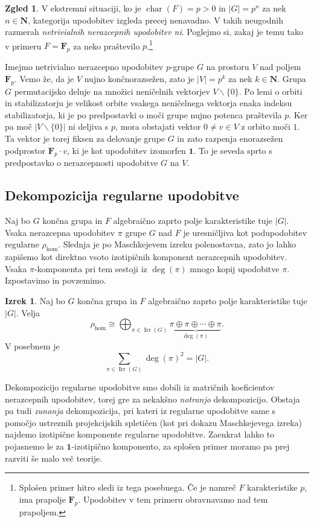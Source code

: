 \documentclass[11pt]{book}
\def\NN{\mathbf{N}}
\def\11{\mathbf{1}}
\def\field{\mathbf{F}}
\DeclareMathOperator\Irr{Irr}
\DeclareMathOperator\characteristic{char}
\theoremstyle{definition}
\theoremstyle{zgled}
\newtheorem*{zgled}{Zgled}
\theoremstyle{odprtproblem}
\theoremstyle{domacanaloga}
\theoremstyle{izrek}
\newtheorem*{izrek}{Izrek}
\begin{document}
\begin{zgled}
V ekstremni situaciji, ko je $\characteristic(F) = p > 0$ in $|G| = p^n$ za nek $n \in \NN$, kategorija upodobitev izgleda precej nenavadno. V takih neugodnih razmerah \emph{netrivialnih nerazcepnih upodobitev ni}. Poglejmo si, zakaj je temu tako v primeru $F = \field_p$ za neko praštevilo $p$.\footnote{Splošen primer hitro sledi iz tega posebnega. Če je namreč $F$ karakteristike $p$, ima prapolje $\field_p$. Upodobitev v tem primeru obravnavamo nad tem prapoljem.}

Imejmo netrivialno nerazcepno upodobitev $p$-grupe $G$ na prostoru $V$ nad poljem $\field_p$. Vemo že, da je $V$ nujno končnorazsežen, zato je $|V| = p^k$ za nek $k \in \NN$. Grupa $G$ permutacijsko deluje na množici neničelnih vektorjev $V \backslash \{ 0 \}$. Po lemi o orbiti in stabilizatorju je velikost orbite vsakega neničelnega vektorja enaka indeksu stabilizatorja, ki je po predpostavki o moči grupe nujno potenca praštevila $p$. Ker pa moč $|V \backslash \{ 0 \}|$ ni deljiva s $p$, mora obstajati vektor $0 \neq v \in V$ z orbito moči $1$. Ta vektor je torej fiksen za delovanje grupe $G$ in zato razpenja enorazsežen podprostor $\field_p \cdot v$, ki je kot upodobitev izomorfen $\11$. To je seveda sprto s predpostavko o nerazcepnosti upodobitve $G$ na $V$.
\end{zgled}

\subsection{Dekompozicija regularne upodobitve}

Naj bo $G$ končna grupa in $F$ algebraično zaprto polje karakteristike tuje $|G|$. Vsaka nerazcepna upodobitev $\pi$ grupe $G$ nad $F$ je uresničljiva kot podupodobitev regularne $\rho_{\hom}$. Slednja je po Maschkejevem izreku polenostavna, zato jo lahko zapišemo kot direktno vsoto izotipičnih komponent nerazcepnih upodobitev. Vsaka $\pi$-komponenta pri tem sestoji iz $\deg(\pi)$ mnogo kopij upodobitve $\pi$. Izpostavimo in povzemimo.

\begin{izrek}
Naj bo $G$ končna grupa in $F$ algebraično zaprto polje karakteristike tuje $|G|$. Velja
\[
    \rho_{\hom} \cong \bigoplus_{\pi \in \Irr(G)} \underbrace{\pi \oplus \pi \oplus \cdots \oplus \pi}_{\deg(\pi)}.
\]
V posebnem je 
\[
    \sum_{\pi \in \Irr(G)} \deg(\pi)^2 = |G|.
\]
\end{izrek}

Dekompozicijo regularne upodobitve smo dobili iz matričnih koeficientov nerazcepnih upodobitev, torej gre za nekakšno \emph{notranjo} dekompozicijo. Obstaja pa tudi \emph{zunanja} dekompozicija, pri kateri iz regularne upodobitve same s pomočjo ustreznih projekcijskih spletičen (kot pri dokazu Maschkejevega izreka) najdemo izotipične komponente regularne upodobitve. Zaenkrat lahko to pojasnemo le za $\11$-izotipično komponento, za splošen primer moramo pa prej razviti še malo več teorije.
\end{document}
